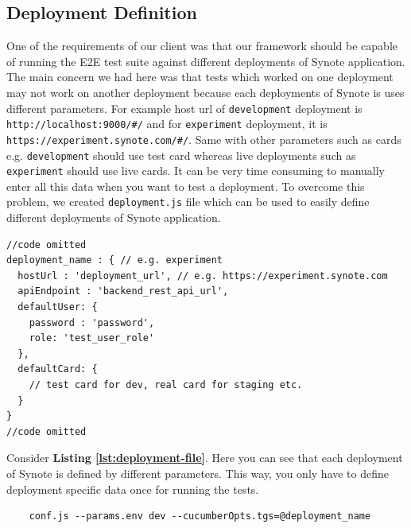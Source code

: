 \subsection{Deployment Definition}
\label{subsec:deployment-definition}
One of the requirements of our client was that our framework should be capable of running the E2E test suite against different deployments of Synote application. The main concern we had here was that tests which worked on one deployment may not work on another deployment because each deployments of Synote is uses different parameters. For example host url of \texttt{development} deployment is \texttt{http://localhost:9000/\#/} and for  \texttt{experiment} deployment, it is \texttt{https://experiment.synote.com/\#/}. Same with other parameters such as cards e.g. \texttt{development} should use test card whereas live deployments such as \texttt{experiment} should use live cards. It can be very time consuming to manually enter all this data when you want to test a deployment. To overcome this problem, we created \texttt{deployment.js} file which can be used to easily define different deployments of Synote application.

\begin{listing}[H]
\begin{verbatim}
//code omitted
deployment_name : { // e.g. experiment
  hostUrl : 'deployment_url', // e.g. https://experiment.synote.com
  apiEndpoint : 'backend_rest_api_url',
  defaultUser: {
    password : 'password',
    role: 'test_user_role'
  },
  defaultCard: {
    // test card for dev, real card for staging etc.
  }
}
//code omitted
\end{verbatim}
\label{lst:deployment-file}
\end{listing}

Consider \textbf{Listing \ref{lst:deployment-file}}. Here you can see that each deployment of Synote is defined by different parameters. This way, you only have to define deployment specific data once for running the tests.

\begin{listing}[H]
\begin{verbatim}
	conf.js --params.env dev --cucumberOpts.tgs=@deployment_name
\end{verbatim}
\label{lst:specifying-deployment-test-run}
\end{listing}

